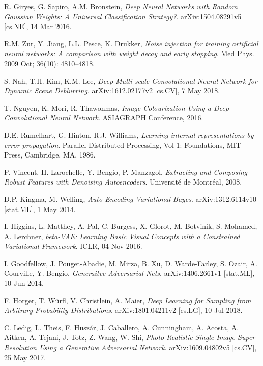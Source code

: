 \documentclass[a4paper]{article}
\begin{document}
\begin{thebibliography}{999}
  R. Giryes, G. Sapiro, A.M. Bronstein,
  \emph{Deep Neural Networks with Random Gaussian Weights: A Universal Classification Strategy?}.
  arXiv:1504.08291v5 [cs.NE],
  14 Mar 2016.

  R.M. Zur, Y. Jiang, L.L. Pesce, K. Drukker,
  \emph{Noise injection for training artificial neural networks: A comparison with weight decay and early stopping}.
  Med Phys.
  2009 Oct;
  36(10): 4810–4818.

  S. Nah, T.H. Kim, K.M. Lee,
  \emph{Deep Multi-scale Convolutional Neural Network for Dynamic Scene Deblurring}.
  arXiv:1612.02177v2 [cs.CV],
  7 May 2018.

  T. Nguyen, K. Mori, R. Thawonmas,
  \emph{Image Colourization Using a Deep Convolutional Neural Network}.
  ASIAGRAPH Conference,
  2016.

  D.E. Rumelhart, G. Hinton, R.J. Williams,
  \emph{Learning internal representations by error propagation}.
  Parallel Distributed Processing,
  Vol 1: Foundations,
  MIT Press,
  Cambridge, MA,
  1986.

  P. Vincent, H. Larochelle, Y. Bengio, P. Manzagol,
  \emph{Extracting and Composing Robust Features with Denoising Autoencoders}.
  Universit\'e de Montr\'eal,
  2008.

  D.P. Kingma, M. Welling,
  \emph{Auto-Encoding Variational Bayes}.
  arXiv:1312.6114v10 [stat.ML],
  1 May 2014.

  I. Higgins, L. Matthey, A. Pal, C. Burgess, X. Glorot, M. Botvinik, S. Mohamed, A. Lerchner,
  \emph{beta-VAE: Learning Basic Visual Concepts with a Constrained Variational Framework}.
  ICLR,
  04 Nov 2016.

  I. Goodfellow, J. Pouget-Abadie, M. Mirza, B. Xu, D. Warde-Farley, S. Ozair, A. Courville, Y. Bengio,
  \emph{Generaitve Adversarial Nets}.
  arXiv:1406.2661v1 [stat.ML],
  10 Jun 2014.

  F. Horger, T. W\"urfl, V. Christlein, A. Maier,
  \emph{Deep Learning for Sampling from Arbitrary Probability Distributions}.
  arXiv:1801.04211v2 [cs.LG],
  10 Jul 2018.

  C. Ledig, L. Theis, F. Husz\'ar, J. Caballero, A. Cunningham, A. Acosta, A. Aitken, A. Tejani, J. Totz, Z. Wang, W. Shi,
  \emph{Photo-Realistic Single Image Super-Resolution Using a Generative Adversarial Network}.
  arXiv:1609.04802v5 [cs.CV],
  25 May 2017.


\end{thebibliography}
\end{document}
